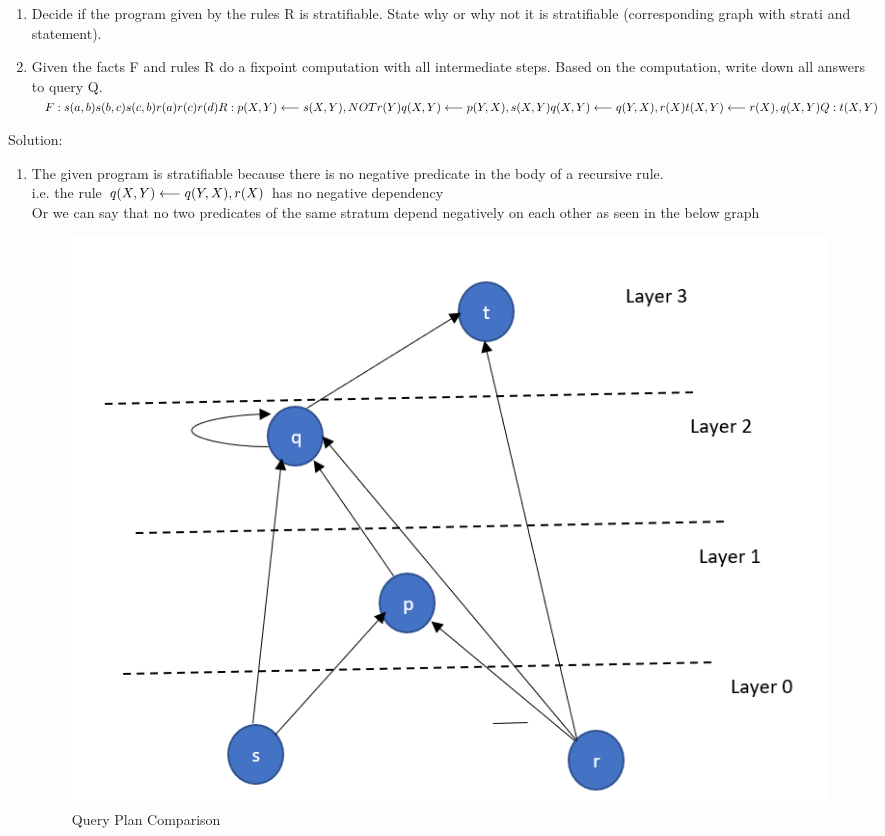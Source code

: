 \documentclass[10pt]{article}
\begin{document}
\begin{enumerate}
\begin{enumerate}
	        \item  Decide if the program given by the rules R is stratifiable. State why or why not it is stratifiable 					(corresponding graph with strati and statement).
	        \item Given the facts F and rules R do a fixpoint computation with all intermediate steps. Based on the computation, 				write down all answers to query Q. 
	        $
	        \\F: s(a,b) s(b,c) s(c,b) 
	            \\r(a) r(c) r(d)
            \\R: p(X,Y) \longleftarrow s(X,Y), NOT r(Y) 
                \\q(X,Y) \longleftarrow p(Y,X), s(X,Y) 
                \\q(X,Y) \longleftarrow q(Y,X), r(X) 
                \\t(X,Y) \longleftarrow r(X), q(X,Y)
            \\Q: t(X,Y)
            $

	    \end{enumerate}
	    Solution:
	    \begin{enumerate}
	        \item The given program is stratifiable because there is no negative predicate in the body of a recursive rule.
	        \\i.e. the rule $\\q(X,Y) \longleftarrow q(Y,X), r(X)$ has no negative dependency
	        \\ Or we can say that no two predicates of the same stratum depend negatively on each other as seen in the below graph
	        
	        
	        \bigskip
	        \begin{figure}[H]
	        	\centering
	        	\includegraphics[]{dgraph.PNG}
	        	\caption{Query Plan Comparison}
	        \end{figure}
	        \bigskip
	        

\end{enumerate}
\end{enumerate}
\end{document}
